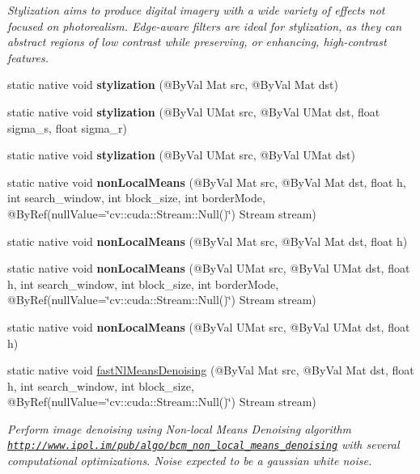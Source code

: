 \begin{DoxyCompactItemize}
\begin{DoxyCompactList}\small\item\em Stylization aims to produce digital imagery with a wide variety of effects not focused on photorealism. Edge-\/aware filters are ideal for stylization, as they can abstract regions of low contrast while preserving, or enhancing, high-\/contrast features. \end{DoxyCompactList}\item 
static native void {\bfseries stylization} (@By\+Val Mat src, @By\+Val Mat dst)
\item 
static native void {\bfseries stylization} (@By\+Val U\+Mat src, @By\+Val U\+Mat dst, float sigma\+\_\+s, float sigma\+\_\+r)
\item 
static native void {\bfseries stylization} (@By\+Val U\+Mat src, @By\+Val U\+Mat dst)
\item 
static native void {\bfseries non\+Local\+Means} (@By\+Val Mat src, @By\+Val Mat dst, float h, int search\+\_\+window, int block\+\_\+size, int border\+Mode, @By\+Ref(null\+Value=\char`\"{}cv\+::cuda\+::\+Stream\+::\+Null()\char`\"{}) Stream stream)
\item 
static native void {\bfseries non\+Local\+Means} (@By\+Val Mat src, @By\+Val Mat dst, float h)
\item 
static native void {\bfseries non\+Local\+Means} (@By\+Val U\+Mat src, @By\+Val U\+Mat dst, float h, int search\+\_\+window, int block\+\_\+size, int border\+Mode, @By\+Ref(null\+Value=\char`\"{}cv\+::cuda\+::\+Stream\+::\+Null()\char`\"{}) Stream stream)
\item 
static native void {\bfseries non\+Local\+Means} (@By\+Val U\+Mat src, @By\+Val U\+Mat dst, float h)
\item 
static native void \hyperlink{group__photo__denoise_gaec9cf0273a944c7f99b00f2766c93876}{fast\+Nl\+Means\+Denoising} (@By\+Val Mat src, @By\+Val Mat dst, float h, int search\+\_\+window, int block\+\_\+size, @By\+Ref(null\+Value=\char`\"{}cv\+::cuda\+::\+Stream\+::\+Null()\char`\"{}) Stream stream)
\begin{DoxyCompactList}\small\item\em Perform image denoising using Non-\/local Means Denoising algorithm \href{http://www.ipol.im/pub/algo/bcm_non_local_means_denoising}{\tt http\+://www.\+ipol.\+im/pub/algo/bcm\+\_\+non\+\_\+local\+\_\+means\+\_\+denoising} with several computational optimizations. Noise expected to be a gaussian white noise. \end{DoxyCompactList}\item 

\end{DoxyCompactItemize}
